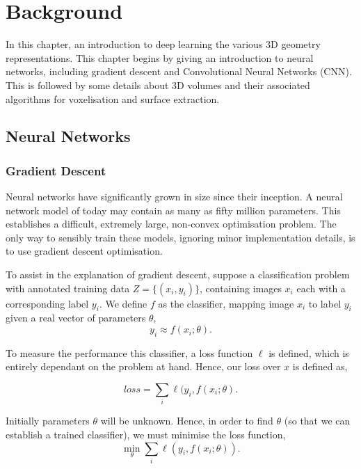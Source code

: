 \chapter{Background}
\label{chapter:background}

In this chapter, an introduction to deep learning the various 3D
geometry representations. This chapter begins by giving an
introduction to neural networks, including gradient descent and
Convolutional Neural Networks (CNN). This is followed by some details
about 3D volumes and their associated algorithms for voxelisation and
surface extraction.


\section{Neural Networks}
\label{sec:background:nn}

\subsection{Gradient Descent}

Neural networks have significantly grown in size since their
inception. A neural network model of today may contain as many as
fifty million parameters. This establishes a difficult, extremely
large, non-convex optimisation problem. The only way to sensibly train
these models, ignoring minor implementation details, is to use
gradient descent optimisation.


To assist in the explanation of gradient descent, suppose a
classification problem with annotated training data
$Z = \{(x_i, y_i)\}$, containing images $x_i$ each with a
corresponding label $y_i$. We define $f$ as the classifier, mapping
image $x_i$ to label $y_i$ given a real vector of parameters $\theta$,
\begin{equation}
  y_i \approx f(x_i;\theta) .
\end{equation}

\noindent To measure the performance this classifier, a loss function
$\ell$ is defined, which is entirely dependant on the problem at
hand. Hence, our loss over $x$ is defined as,

\begin{equation}
  loss = \sum_i \ell(y_i, f(x_i ; \theta) .
\end{equation}


\noindent Initially parameters $\theta$ will be unknown. Hence, in
order to find $\theta$ (so that we can establish a trained
classifier), we must minimise the loss function,
\begin{equation}
  \min_\theta \sum_i \ell(y_i, f(x_i ; \theta)) .
\end{equation}



